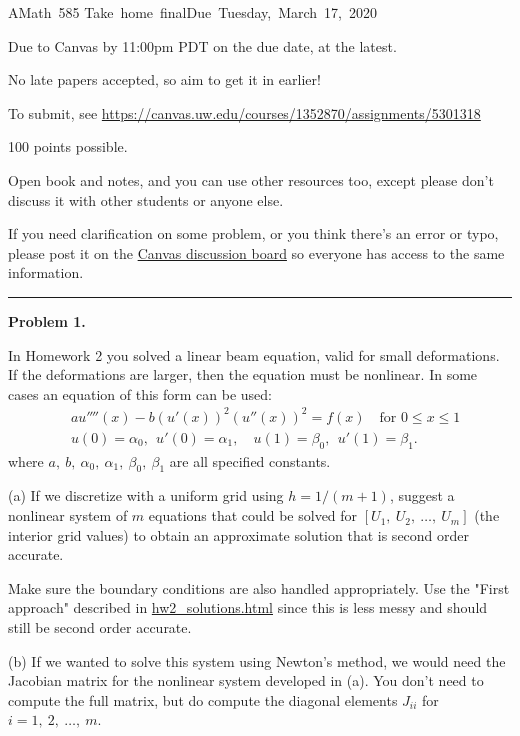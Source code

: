 \documentclass[10pt]{article}
\begin{document}
\hfill\vbox{\hbox{AMath 585}
\hbox{Take home final}\hbox{Due Tuesday, March 17, 2020}}

\vskip 5pt

Due to Canvas by 11:00pm PDT on the due date, at the latest.

No late papers accepted, so aim to get it in earlier!

To submit, see
\url{https://canvas.uw.edu/courses/1352870/assignments/5301318}

100 points possible.  

Open book and notes, and you can use other resources too, except please don't discuss it with other students or anyone else.

If you need clarification on some problem, or you think there's an error or
typo, please post it on the 
\href{https://canvas.uw.edu/courses/1352870/discussion_topics}{Canvas discussion board}
so everyone has access to the same information.

\vskip 1cm
\hrule
{\bf Problem 1.}

In Homework 2 you solved a linear beam equation, valid for small deformations.
If the deformations are larger, then the equation must be nonlinear.  In some
cases an equation of this form can be used:
\begin{align*}
&a u''''(x) - b(u'(x))^2 (u''(x))^2 = f(x) \quad\text{for~} 0\leq x \leq 1\\
&u(0) = \alpha_0,~~u'(0) = \alpha_1, \quad
u(1) = \beta_0,~~u'(1) = \beta_1.
\end{align*}
where $a,~b,~\alpha_0,~\alpha_1,~\beta_0,~\beta_1$ are all specified constants.

(a) If we discretize with a uniform grid using $h=1/(m+1)$, suggest a 
nonlinear system of $m$ equations that could be solved for 
$[U_1,~U_2,~\ldots,~U_m]$ (the interior grid values) 
to obtain an approximate solution that is second order accurate.  

Make sure the boundary conditions are also handled appropriately.
Use the "First approach" described in 
\href{http://staff.washington.edu/rjl/classes/am585w2020/solutions/hw2\_solutions.html}{hw2\_solutions.html} 
since this is less messy and should still be second order accurate.


(b) If we wanted to solve this system using Newton's method, we would need
the Jacobian matrix for the nonlinear system developed in (a).  
You don't need to compute the full matrix,
but do compute the diagonal elements $J_{ii}$ for $i=1,~2,~\ldots,~m$.
\end{document}
